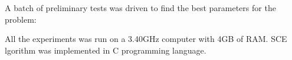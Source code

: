 A batch of preliminary tests was driven to find the best parameters for the
problem:\vspace{-2mm}
\begin{center}
  
\end{center}
All the experiments was run on a 3.40GHz computer with 4GB of RAM.
SCE lgorithm was implemented in C programming language.
